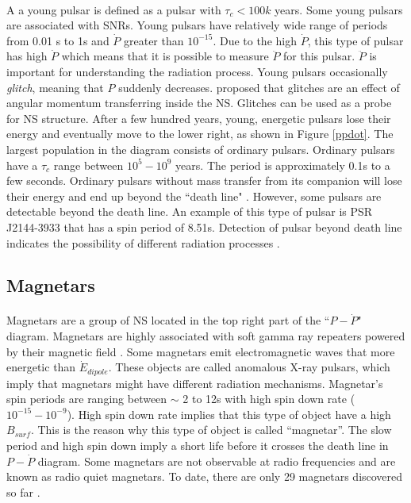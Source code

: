 \documentclass[thesis_msc.tex]{subfiles}
\begin{document}
\paragraph{} A a young pulsar is defined as a pulsar with $\tau_c < 100k$ years. Some young pulsars are associated with SNRs. Young pulsars have relatively wide range of periods from 0.01 s to 1s and $\dot{P}$ greater than $10^{-15}$. Due to the high $\dot{P}$, this type of pulsar has high $\dot{P}$  which means that it is possible to measure $\ddot{P}$ for this pulsar. 
$\ddot{P}$  is important for understanding the radiation process. Young pulsars occasionally \textit{glitch}, meaning that $P$ suddenly decreases. \cite{link1992pulsar} proposed that glitches are an effect of angular momentum transferring inside the NS. Glitches can be used as a probe for NS structure. After a few hundred years, young, energetic pulsars lose their energy and eventually move to the lower right, as shown in Figure \ref{ppdot}. The  largest population in the diagram consists of ordinary pulsars. Ordinary pulsars have a $\tau_c$ range between $10^5 - 10^9$ years. The period is approximately 0.1s to a few seconds. Ordinary pulsars without mass transfer from its companion will lose their energy and end up beyond the  ``death line" \citep{chen1993pulsar}. However, %
some pulsars are detectable beyond the death line.  An example of this type of pulsar is PSR J2144-3933 that has a spin period of 8.51s. Detection of pulsar beyond death line indicates the possibility of different radiation processes \citep{zhang2000radio}.        


\subsection{Magnetars} \label{magnetar}

\paragraph{} Magnetars are a group of NS located in the top right part of the ``$P-\dot{P}$" diagram. Magnetars are highly associated with soft gamma ray repeaters powered by their magnetic field \citep{duncan1992formation}. Some magnetars emit electromagnetic waves that more energetic than $\dot{E}_{dipole}$. These objects are called anomalous X-ray pulsars, which imply that magnetars might have different radiation mechanisms. Magnetar's spin periods are ranging between $\sim$ 2 to 12s with high spin down rate ($10^{-15}-10^{-9}$). High spin down rate implies that this type of object have a high $B_{surf}$. This is the reason why this type of object is called ``magnetar''. The slow period and high spin down imply a short life before it crosses the death line in $P-\dot{P}$ diagram.  Some magnetars are not observable at radio frequencies and are known as radio quiet  magnetars. To date, there are only 29 magnetars discovered so far \citep{Olausen:2013bpa}.
\end{document}
